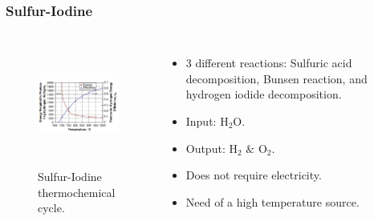 \begin{frame}
\frametitle{Sulfur-Iodine}
\begin{columns}
    \column[t]{5cm}
   	\begin{figure}[htbp!]
		\begin{center}
			\includegraphics[height=4.0cm]{images/si-energy.png}
		\end{center}
		\caption{Sulfur-Iodine thermochemical cycle.}
 	\end{figure}

 	\column[t]{5cm}
 	\begin{itemize}
 		\item 3 different reactions: Sulfuric acid decomposition, Bunsen reaction, and hydrogen iodide decomposition.
 		\item Input: H$_2$O.
 		\item Output: H$_2$ $\&$ O$_2$. 
 		\item Does not require electricity.
 		\item Need of a high temperature source.
 	\end{itemize}
\end{columns}
\end{frame}


